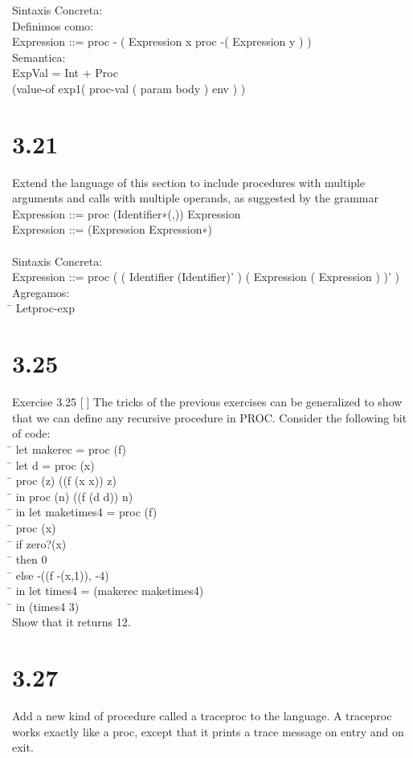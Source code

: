 \documentclass{article}
\begin{document}
\begin{tab}
Sintaxis Concreta:\\
Definimos como:\\
Expression ::= proc - ( Expression x proc -( Expression y ) )\\

Semantica:\\
ExpVal = Int + Proc\\
(value-of exp1( proc-val ( param body ) env ) )

\newpage
\section{ 3.21 } 
Extend the language of this section to include procedures with multiple arguments and calls with multiple operands, as suggested by the grammar \\
Expression ::= proc ({Identifier}∗(,)) Expression\\
Expression ::= (Expression {Expression}∗)\\ \\

Sintaxis Concreta:\\
Expression ::= proc ( ( {Identifier} (Identifier)' ) ( Expression ( Expression ) )' )\\
Agregamos:\\
\= \> Letproc-exp 

\newpage
\section{3.25}
Exercise 3.25 [] The tricks of the previous exercises can be generalized to show that
we can define any recursive procedure in PROC. Consider the following bit of code:\\
\= \> let makerec = proc (f)\\
\= \> \> let d = proc (x)\\
\= \> \>\> proc (z) ((f (x x)) z)\\
\= \> \>in proc (n) ((f (d d)) n)\\
\= \> in let maketimes4 = proc (f)\\
\= \> \> proc (x)\\
\= \> \> if zero?(x)\\
\= \> \> then 0\\
\= \> \> else -((f -(x,1)), -4)\\
\= \> in let times4 = (makerec maketimes4)\\
\= \> \> in (times4 3)\\
Show that it returns 12.

\newpage
\section{3.27}
Add a new kind of procedure called a traceproc to the language. A traceproc works exactly like a proc, except that it prints a trace message on entry and on exit.



    
\end{tab}
\end{document}

